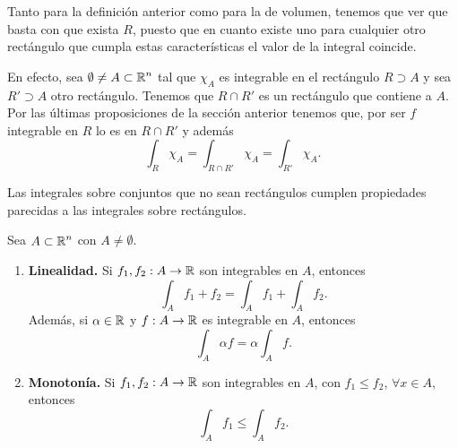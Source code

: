 \begin{observation}
	Tanto para la definición anterior como para la de volumen, tenemos que ver que basta con que exista $\displaystyle R $, puesto que en cuanto existe uno para cualquier otro rectángulo que cumpla estas características el valor de la integral coincide. 

	En efecto, sea $\displaystyle \emptyset\neq  A \subset \mathbb{R}^{n}$ tal que $\displaystyle \chi_{A} $ es integrable en el rectángulo $\displaystyle R \supset A $ y sea $\displaystyle R' \supset A $ otro rectángulo. Tenemos que $\displaystyle R \cap R' $ es un rectángulo que contiene a $\displaystyle A $. Por las últimas proposiciones de la sección anterior tenemos que, por ser $\displaystyle f $ integrable en $\displaystyle R $ lo es en $\displaystyle R \cap R' $ y además
	\[\int _{R}\chi_{A} = \int _{R \cap R'}\chi_{A} = \int _{R'}\chi_{A}  .\]
\end{observation}
Las integrales sobre conjuntos que no sean rectángulos cumplen propiedades parecidas a las integrales sobre rectángulos.
\begin{prop} Sea $\displaystyle A \subset \mathbb{R}^{n} $ con $\displaystyle A \neq \emptyset $. 
	\begin{enumerate}
	\item \textbf{Linealidad.} Si $\displaystyle f_{1}, f_{2} : A \to \mathbb{R} $ son integrables en $\displaystyle A $, entonces
		\[\int _{A}f_{1} + f_{2} = \int _{A}f_{1} +\int _{A}f_{2}  .\]
		Además, si $\displaystyle \alpha\in \mathbb{R} $ y $\displaystyle f : A \to \mathbb{R} $ es integrable en $\displaystyle A $, entonces
		\[\int _{A}\alpha f = \alpha \int _{A}f  .\]
	\item \textbf{Monotonía.} Si $\displaystyle f_{1}, f_{2} : A \to \mathbb{R} $ son integrables en $\displaystyle A $, con $\displaystyle f_{1} \leq f_{2} $, $\displaystyle \forall x \in A $, entonces
		\[\int _{A}f_{1} \leq \int _{A}f_{2}  .\]
	\end{enumerate}
\end{prop}
